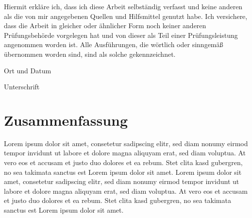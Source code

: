 \pagestyle{plain}
\hphantom{ }
\vfill
{}\par\vspace{2mm}
\par\vspace{1cm}
\noindent Hiermit erkläre ich, dass ich diese Arbeit selbständig verfasst und keine anderen als die von mir angegebenen Quellen und Hilfsmittel genutzt habe. Ich versichere, dass die Arbeit in gleicher oder ähnlicher Form noch keiner anderen Prüfungsbehörde vorgelegen hat und von dieser als Teil einer Prüfungsleistung angenommen worden ist. Alle Ausführungen, die wörtlich oder sinngemäß übernommen worden sind, sind als solche gekennzeichnet.

\vspace{2cm}
\noindent\begin{minipage}{.4\linewidth}
	\centering
	\hrulefill\par 
	Ort und Datum
\end{minipage}\hfill
\begin{minipage}{.4\linewidth}
	\centering
	\hrulefill\par 
	Unterschrift
\end{minipage}
\cleardoublepage

\chapter*{Zusammenfassung\newline {}}

Lorem ipsum dolor sit amet, consetetur sadipscing elitr, sed diam nonumy eirmod tempor invidunt ut labore et dolore magna aliquyam erat, sed diam voluptua. At vero eos et accusam et justo duo dolores et ea rebum. Stet clita kasd gubergren, no sea takimata sanctus est Lorem ipsum dolor sit amet. Lorem ipsum dolor sit amet, consetetur sadipscing elitr, sed diam nonumy eirmod tempor invidunt ut labore et dolore magna aliquyam erat, sed diam voluptua. At vero eos et accusam et justo duo dolores et ea rebum. Stet clita kasd gubergren, no sea takimata sanctus est Lorem ipsum dolor sit amet.


\pagestyle{running}
\renewcommand{\contentsname}{\de{Inhaltsverzeichnis}\en{Table of Contents}}
\tableofcontents

\listoffigures
